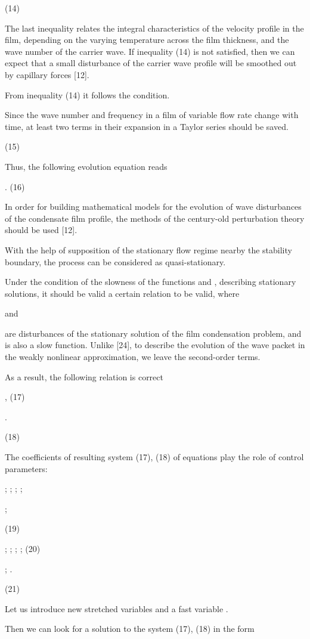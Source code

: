 \begin{multicols}{2}
(14)

The last inequality relates the integral characteristics of the velocity
profile in the film, depending on the varying temperature across the
film thickness, and the wave number of the carrier wave. If inequality
(14) is not satisfied, then we can expect that a small disturbance of
the carrier wave profile will be smoothed out by capillary forces
{[}12{]}.

From inequality (14) it follows the
condition.

Since the wave number and frequency in a film of variable flow rate
change with time, at least two terms in their expansion in a Taylor
series should be saved.


(15)

Thus, the following evolution equation reads

.
(16)

In order for building mathematical models for the evolution of wave
disturbances of the condensate film profile, the methods of the
century-old perturbation theory should be used {[}12{]}.

With the help of supposition of the stationary flow regime nearby the
stability boundary, the process can be considered as quasi-stationary.

Under the condition of the slowness of the
functions
and
,
describing stationary solutions, it should be valid a certain relation
to
be valid, where

and

are disturbances of the stationary solution of the film condensation
problem, and is also a slow function. Unlike {[}24{]}, to describe the
evolution of the wave packet in the weakly nonlinear approximation, we
leave the second-order terms.

As a result, the following relation is correct

,
(17)

.

(18)

The coefficients of resulting system (17), (18) of equations play the
role of control parameters:

;
;
;
;

;

(19)

;
;
;
;
(20)

;
.

(21)

Let us introduce new stretched variables
and
a fast variable
.

Then we can look for a solution to the system (17), (18) in the form


\end{multicols}
